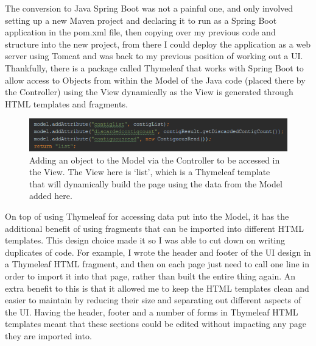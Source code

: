 The conversion to Java Spring Boot was not a painful one, and only involved setting up a new Maven project and declaring it to run as a Spring Boot application in the pom.xml file, then copying over my previous code and structure into the new project, from there I could deploy the application as a web server using Tomcat and was back to my previous position of working out a UI. Thankfully, there is a package called Thymeleaf\cite{thymeleaf} that works with Spring Boot to allow access to Objects from within the Model of the Java code (placed there by the Controller) using the View dynamically as the View is generated through HTML templates and fragments.

\begin{figure}[H]
	\centering
\includegraphics[width=1\textwidth]{images/addingtomodel}
\caption{Adding an object to the Model via the Controller to be accessed in the View. The View here is `list', which is a Thymeleaf template that will dynamically build the page using the data from the Model added here.}
\end{figure}

On top of using Thymeleaf for accessing data put into the Model, it has the additional benefit of using fragments that can be imported into different HTML templates. This design choice made it so I was able to cut down on writing duplicates of code. For example, I wrote the header and footer of the UI design in a Thymeleaf HTML fragment, and then on each page just need to call one line in order to import it into that page, rather than built the entire thing again. An extra benefit to this is that it allowed me to keep the HTML templates clean and easier to maintain by reducing their size and separating out different aspects of the UI. Having the header, footer and a number of forms in Thymeleaf HTML templates meant that these sections could be edited without impacting any page they are imported into.

